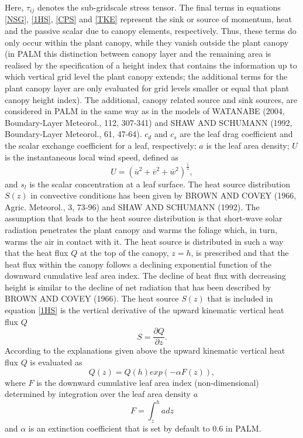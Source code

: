 \documentclass[11pt,a4paper,titlepage]{scrreprt}
\begin{document}
Here, $\tau_{ij}$ denotes the sub-gridscale stress tensor. The final terms in equations \ref{NSG}, \ref{1HS}, \ref{CPS} and \ref{TKE} represent the sink 
or source of momentum, heat and the passive scalar due to canopy elements, respectively. Thus, these terms do only occur within the plant canopy, while 
they vanish outside the plant canopy (in PALM this distinction between canopy layer and the remaining area is realised by the specification of a height 
index that contains the information up to which vertical grid level the plant canopy extends; the additional terms for the plant canopy layer are 
only evaluated for grid levels smaller or equal that plant canopy height index). The additional, canopy related source and sink sources, are considered in 
PALM in the same way as in the models of WATANABE (2004, Boundary-Layer Meteorol., 112, 307-341) and SHAW AND SCHUMANN 
(1992, Boundary-Layer Meteorol., 61, 47-64).   
$c_d$ and $c_s$ are the leaf drag coefficient and the scalar exchange 
coefficient for a leaf, respectively; $a$ is the leaf area density; $U$ is the instantaneous local wind speed, defined as 
\begin{equation}
U = \left (  \overline{u}^2 + \overline{v}^2 + \overline{w}^2 \right )^{\frac{1}{2}},
\end{equation}
and $s_l$ is the scalar concentration at a leaf surface. 
The heat source distribution $S(z)$ in convective conditions has been given by BROWN AND COVEY (1966, Agric. Meteorol., 3, 73-96) and SHAW AND SCHUMANN 
(1992). The assumption that leads to the heat source distribution is that short-wave solar radiation penetrates the plant canopy and warms the foliage 
which, in turn, warms the air in contact with it. The heat source is distributed in such a way that the heat flux $Q$ at the top of the canopy, $z=h$, is 
prescribed and that the heat flux within the canopy follows a declining exponential function of the downward cumulative leaf area index. The decline of 
heat flux with decreasing height is similar to the decline of net radiation that has been described by BROWN AND COVEY (1966). The heat source $S(z)$ that 
is included in equation \ref{1HS} is the vertical derivative of the upward kinematic vertical heat flux $Q$   
\begin{equation}
S = \frac{\partial Q}{\partial z}.
\end{equation}
According to the explanations given above the upward kinematic vertical heat flux $Q$ is evaluated as
\begin{equation} \label{kvh}
Q(z) = Q(h) exp(- \alpha F(z)),
\end{equation}
where $F$ is the downward cumulative leaf area index (non-dimensional) determined by integration over the leaf area density $a$ 
\begin{equation}
F = \int_z^h a dz
\end{equation}
and $\alpha$ is an extinction coefficient that is set by default to 0.6 in PALM.
\end{document}
